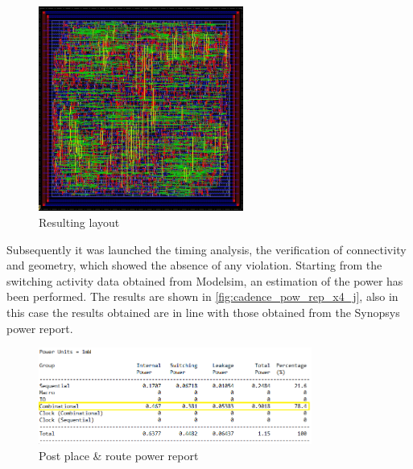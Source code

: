 \begin{figure}[h]
	\center
	\includegraphics[width=0.6\textwidth]{images/IIR_filter_period_min_x4_place_j.jpg}
	\caption{Resulting layout}
	\label{fig:layout_j}
\end{figure}

Subsequently it was launched the timing analysis, the verification of connectivity and geometry, which showed the absence of any violation. Starting from the switching activity data obtained from Modelsim, an estimation of the power has been performed. The results are shown in \autoref{fig:cadence_pow_rep_x4_j}, also in this case the results obtained are in line with those obtained from the Synopsys power report.

\begin{figure}[h]
	\center
	\includegraphics[width=0.8\textwidth]{images/rep_power_x4_cadence_j_mod.png}
	\caption{Post place \& route power report}
	\label{fig:cadence_pow_rep_x4_j}
\end{figure}
